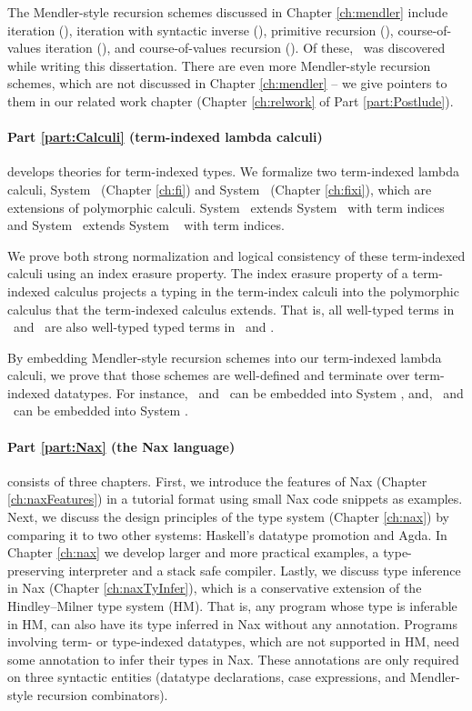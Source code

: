 The Mendler-style recursion schemes discussed in Chapter \ref{ch:mendler}
include iteration (\MIt), iteration with syntactic inverse (\MsfIt),
primitive recursion (\MPr), course-of-values iteration (\McvIt),
and course-of-values recursion (\McvPr). Of these, \MsfIt\ was discovered
while writing this dissertation.
There are even more Mendler-style recursion schemes, which are not
discussed in Chapter \ref{ch:mendler} -- we give pointers to them in our
related work chapter (Chapter \ref{ch:relwork} of Part \ref{part:Postlude}).

\paragraph{Part \ref{part:Calculi} (term-indexed lambda calculi)}\hspace{-1em}
develops theories for term-indexed types.
We formalize two term-indexed lambda calculi,
System \Fi\ (Chapter \ref{ch:fi}) and System \Fixi\ (Chapter \ref{ch:fixi}),
which are extensions of polymorphic calculi.
System \Fi\ extends System \Fw\ with term indices and
System \Fixi\ extends System \Fixw\ \cite{AbeMat04} with term indices.

We prove both strong normalization and logical consistency of
these term-indexed calculi using an index erasure property.
The index erasure property of a term-indexed calculus
projects a typing in the term-index calculi into
the polymorphic calculus that the term-indexed calculus extends.
That is, all well-typed terms in \Fi\ and \Fixi\ are
also well-typed typed terms in \Fw\ and \Fixw.

By embedding Mendler-style recursion schemes into our term-indexed
lambda calculi, we prove that those schemes are well-defined and
terminate over term-indexed datatypes.  For instance,
\MIt\ and \MsfIt\ can be embedded into System \Fi,
and, \MPr\ and \McvPr\ can be embedded into System \Fixi.

\paragraph{Part \ref{part:Nax} (the Nax language)}\hspace{-1em} consists of
three chapters.
First, we introduce the features of Nax (Chapter \ref{ch:naxFeatures})
in a tutorial format using small Nax code snippets as examples.
Next, we discuss the design principles of the type system (Chapter \ref{ch:nax})
by comparing it to two other systems: Haskell's datatype promotion and Agda.
In Chapter \ref{ch:nax} we develop
larger and more practical examples,
a type-preserving interpreter and a stack safe compiler.
Lastly, we discuss type inference in Nax (Chapter \ref{ch:naxTyInfer}),
which is a conservative extension of the Hindley--Milner type system (HM).
That is, any program whose type is inferable in HM, can also have its type
inferred in Nax without any annotation. Programs involving
term- or type-indexed datatypes, which are not supported in HM, need
some annotation to infer their types in Nax. These annotations are only
required on three syntactic entities (datatype declarations, case expressions,
and Mendler-style recursion combinators).

